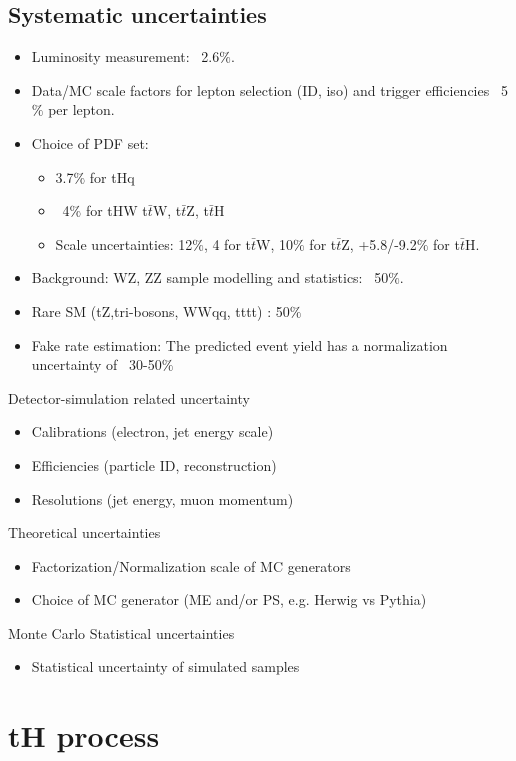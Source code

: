 \begin{linenumbers}
\section{Systematic uncertainties}
\begin{itemize}
	\item Luminosity measurement: ~2.6$\%$.
	\item Data/MC scale factors for lepton selection (ID, iso) and trigger efficiencies ~5$\%$ per lepton.
	\item Choice of PDF set:
	\begin{itemize}
		\item 3.7$\%$ for tHq
		\item ~4$\%$ for tHW t$\bar{t}$W, t$\bar{t}$Z, t$\bar{t}$H 
		\item Scale uncertainties: 12$\%$, 4 for t$\bar{t}$W, 10$\%$ for t$\bar{t}$Z, +5.8/-9.2$\%$ for t$\bar{t}$H.
	\end{itemize}
	\item Background: WZ, ZZ sample modelling and statistics: ~50$\%$.
	\item Rare SM (tZ,tri-bosons, WWqq, tttt) : 50$\%$
	\item Fake rate estimation:
	The predicted event yield has a normalization uncertainty of ~30-50$\%$ 
\end{itemize}

Detector-simulation related uncertainty
\begin{itemize}
\item Calibrations (electron, jet energy scale)
\item Efficiencies (particle ID, reconstruction)
\item Resolutions (jet energy, muon momentum)
\end{itemize}
Theoretical uncertainties
\begin{itemize}
\item  Factorization/Normalization scale of MC generators
\item Choice of MC generator (ME and/or PS, e.g. Herwig vs Pythia)
\end{itemize}
Monte Carlo Statistical uncertainties
\begin{itemize}\item Statistical uncertainty of simulated samples 
\end{itemize}


\chapter{ tH process}  %





\end{linenumbers}
